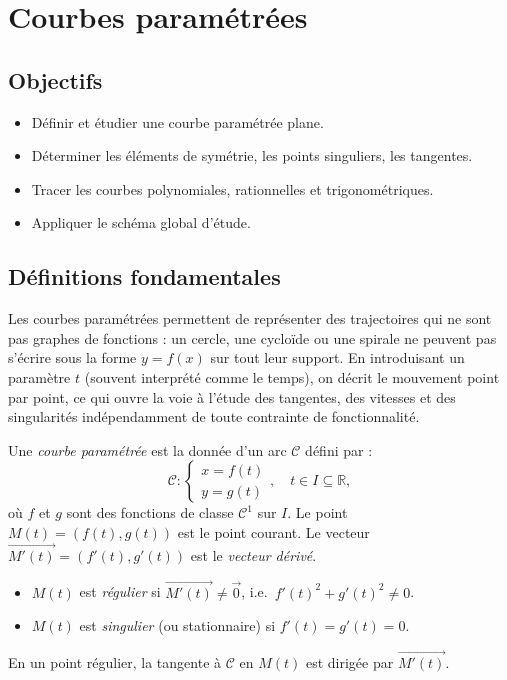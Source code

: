 \documentclass[11pt,a4paper,twoside]{book}
\newcommand{\R}{\mathbb{R}}
\begin{document}
\chapter{Courbes paramétrées}

\section*{Objectifs}
\begin{itemize}[leftmargin=1.5em]
  \item Définir et étudier une courbe paramétrée plane.
  \item Déterminer les éléments de symétrie, les points singuliers, les tangentes.
  \item Tracer les courbes polynomiales, rationnelles et trigonométriques.
  \item Appliquer le schéma global d'étude.
\end{itemize}

\section{Définitions fondamentales}

Les courbes paramétrées permettent de représenter des trajectoires qui ne sont pas graphes de fonctions : un cercle, une cycloïde ou une spirale ne peuvent pas s'écrire sous la forme $y = f(x)$ sur tout leur support. En introduisant un paramètre $t$ (souvent interprété comme le temps), on décrit le mouvement point par point, ce qui ouvre la voie à l'étude des tangentes, des vitesses et des singularités indépendamment de toute contrainte de fonctionnalité.

\begin{definitionbox}
Une \emph{courbe paramétrée} est la donnée d'un arc $\mathcal{C}$ défini par :
\[
  \mathcal{C} : \begin{cases} x = f(t) \\ y = g(t) \end{cases}, \quad t \in I \subseteq \R,
\]
où $f$ et $g$ sont des fonctions de classe $\mathcal{C}^1$ sur $I$.
Le point $M(t) = (f(t),g(t))$ est le point courant.
Le vecteur $\overrightarrow{M'(t)} = (f'(t), g'(t))$ est le \emph{vecteur dérivé}.
\end{definitionbox}

\begin{definitionbox}
\begin{itemize}
  \item $M(t)$ est \emph{régulier} si $\overrightarrow{M'(t)} \neq \vec{0}$, i.e.\ $f'(t)^2+g'(t)^2 \neq 0$.
  \item $M(t)$ est \emph{singulier} (ou stationnaire) si $f'(t) = g'(t) = 0$.
\end{itemize}
En un point régulier, la tangente à $\mathcal{C}$ en $M(t)$ est dirigée par $\overrightarrow{M'(t)}$.
\end{definitionbox}
\end{document}

